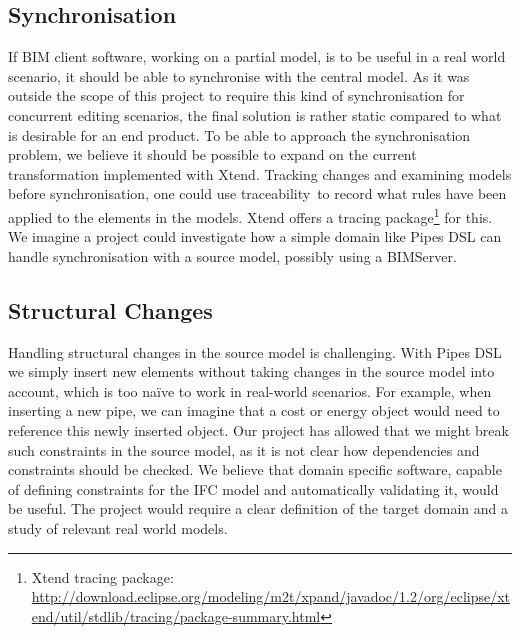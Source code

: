 \subsection{Synchronisation}
If BIM client software, working on a partial model, is to be useful in a real world scenario, it should be able to synchronise with the central model. As it was outside the scope of this project to require this kind of synchronisation for concurrent editing scenarios, the final solution is rather static compared to what is desirable for an end product. To be able to approach the synchronisation problem, we believe it should be possible to expand on the current transformation implemented with Xtend. Tracking changes and examining models before synchronisation, one could use traceability\,\cite{czarnecki06} to record what rules have been applied to the elements in the models. Xtend offers a tracing package\footnote{Xtend tracing package: \url{http://download.eclipse.org/modeling/m2t/xpand/javadoc/1.2/org/eclipse/xtend/util/stdlib/tracing/package-summary.html}} for this. We imagine a project could investigate how a simple domain like Pipes DSL can handle synchronisation with a source model, possibly using a BIMServer.

\subsection{Structural Changes}
Handling structural changes in the source model is challenging. With Pipes DSL we simply insert new elements without taking changes in the source model into account, which is too na\"{i}ve to work in real-world scenarios. For example, when inserting a new pipe, we can imagine that a cost or energy object would need to reference this newly inserted object. Our project has allowed that we might break such constraints in the source model, as it is not clear how dependencies and constraints should be checked. We believe that domain specific software, capable of defining constraints for the IFC model and automatically validating it, would be useful. The project would require a clear definition of the target domain and a study of relevant real world models.





